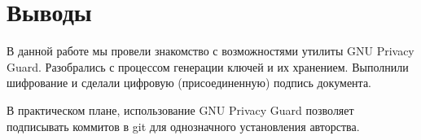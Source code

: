 \section*{Выводы}

В данной работе мы провели знакомство с возможностями утилиты GNU Privacy Guard. Разобрались с процессом генерации ключей и их хранением. Выполнили шифрование и сделали цифровую (присоединенную) подпись документа.

В практическом плане, использование GNU Privacy Guard позволяет подписывать коммитов в git для однозначного установления авторства.
